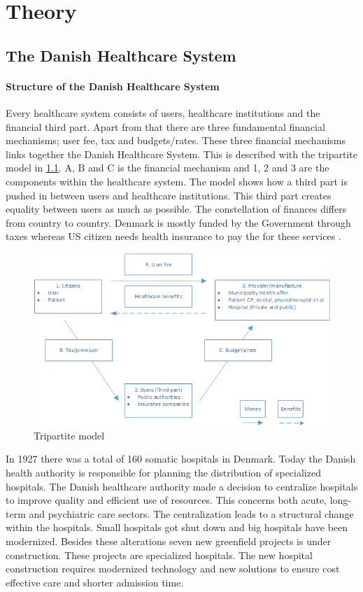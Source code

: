 \chapter{Theory}

\section{The Danish Healthcare System} \label{DHS}
\subsubsection{Structure of the Danish Healthcare System}
Every healthcare system consists of users, healthcare institutions and the financial third part. Apart from that there are three fundamental financial mechanisms; user fee, tax and budgets/rates. These three financial mechanisms links together the Danish Healthcare System. This is described with the tripartite model in \cref{Trepartmodel}. A, B and C is the financial mechanism and 1, 2 and 3 are the components within the healthcare system. The model shows how a third part is pushed in between users and healthcare institutions. This third part creates equality between users as much as possible. The constellation of finances differs from country to country. Denmark is mostly funded by the Government through taxes whereas US citizen needs health insurance to pay the for these services \cite{sundhedsvaesen}. 


\begin{figure}[H]
\centering
\includegraphics[width=1\textwidth]{Figure/thirdpart.png}
\caption{Tripartite model \cite{sundhedsvaesen}}
\label{Trepartmodel}
\end{figure} 

In 1927 there was a total of 160 somatic hospitals in Denmark. Today the Danish health authority is responsible for planning the distribution of specialized hospitals. The Danish healthcare authority made a decision to centralize hospitals to improve quality and efficient use of resources. This concerns both acute, long-term and psychiatric care sectors.
The centralization leads to a structural change within the hospitals. Small hospitals got shut down and big hospitals have been modernized. Besides these alterations seven new greenfield projects is under construction. These projects are specialized hospitals. The new hospital construction requires modernized technology and new solutions to ensure cost effective care and shorter admission time. 

